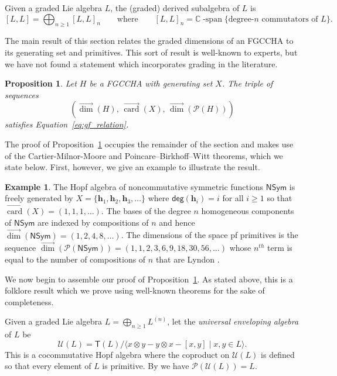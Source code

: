 \documentclass[11pt]{amsart}
\newtheorem{proposition}[theorem]{Proposition}
\theoremstyle{definition}
\newtheorem{example}[theorem]{Example}
\numberwithin{equation}{section}
\def\CC{{\mathbb C}}
\newcommand{\FGCCHA}{\textsf{FGCCHA}\xspace}
\newcommand{\vecdim}{\overrightarrow{\dim}}
\newcommand{\veccard}{\overrightarrow{\operatorname{card}}}
\begin{document}
Given a graded Lie algebra $L$, the (graded) derived subalgebra of $L$ is 
\begin{equation}
\label{eq:derivedLiesubalgebra}
[L, L] = \bigoplus_{n \ge 1} [L, L]_{n}
\qquad\text{where}\qquad
[L, L]_{n} = \CC\operatorname{-span}\{\text{degree-$n$ commutators of $L$}\}.
\end{equation}

The main result of this section relates the graded dimensions of an \FGCCHA to its generating set and primitives.  
This sort of result is well-known to experts, but we have not found a statement which incorporates grading in the literature.  

\begin{proposition}
\label{prop:SequencesAsHopfStructures}
Let $H$ be a \FGCCHA with generating set $X$.  The triple of sequences
\[
\left(\vecdim(H), \,
\veccard(X),\,
\vecdim\left(\mathcal{P}(H)\right) \right)
\]
satisfies Equation~\eqref{eq:gf_relation}.
\end{proposition}

The proof of Proposition~\ref{prop:SequencesAsHopfStructures} occupies the remainder of the section and makes use of the Cartier-Milnor-Moore and Poincare--Birkhoff--Witt theorems, which we state below.  First, however,  we give an example to illustrate the result.  

\begin{example}
\label{ex:NSym}
The Hopf algebra of noncommutative symmetric functions $\mathsf{NSym}$ \cite{GKLLRT}
is freely generated by $X = \{ \mathbf{h}_1, \mathbf{h}_2, \mathbf{h}_3, \ldots \}$ where $\mathsf{deg}(\mathbf{h}_{i}) = i$ for all $i \ge 1$ so that $\veccard(X) = (1, 1, 1, \ldots)$.  
The bases of the degree $n$ homogeneous components of $\mathsf{NSym}$ are indexed by compositions
of $n$ and hence $\vecdim(\mathsf{NSym}) = (1,2,4,8,\ldots)$.
The dimensions of the space pf primitives is the sequence 
$\vecdim(\mathcal{P}(\mathsf{NSym})) = (1, 1, 2, 3, 6, 9, 18, 30, 56, \ldots)$
whose $n^{th}$ term is equal to the number
of compositions of $n$ that are Lyndon \cite{H07}.
\end{example}

We now begin to assemble our proof of Proposition~\ref{prop:SequencesAsHopfStructures}.  
As stated above, this is a folklore result which we prove using well-known theorems for the sake of completeness.  

Given a graded Lie algebra $L = \bigoplus_{n \ge 1} L^{(n)}$, let the \emph{universal enveloping algebra} of $L$ be
\[
\mathcal{U}(L) = \mathsf{T}(L) \big/ \big\langle x\otimes y - y \otimes x - [x, y] \;|\; \text{$x, y \in L$} \big\rangle.
\]
This is a cocommutative Hopf algebra where the coproduct on $\mathcal{U}(L)$ is defined so that every element of $L$ is primitive.  By \cite[Theorem 1.4]{Reutenauer-FreeLieAlgebras} we have $\mathcal{P}(\mathcal{U}(L))=L$.  
\end{document}
